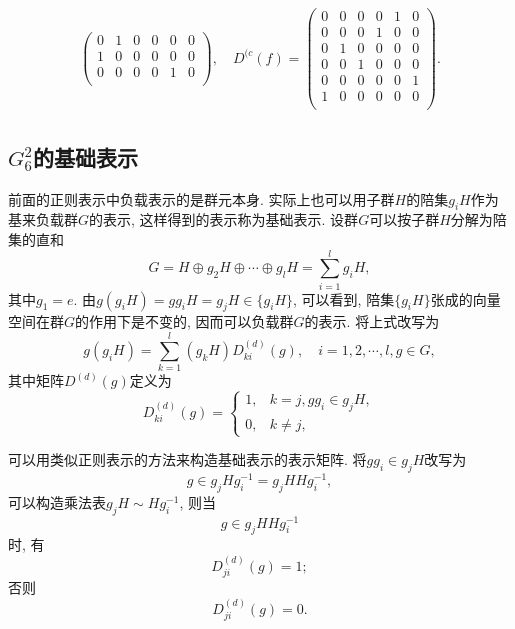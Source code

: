 \documentclass[UTF8]{ctexart}
\begin{document}
\begin{gather}
\begin{pmatrix}
    0 & 1 & 0 & 0 & 0 & 0 \\
    1 & 0 & 0 & 0 & 0 & 0 \\
    0 & 0 & 0 & 0 & 1 & 0 \\
  \end{pmatrix}, \quad
  D^{(c}(f) =
  \begin{pmatrix}
    0 & 0 & 0 & 0 & 1 & 0 \\
    0 & 0 & 0 & 1 & 0 & 0 \\
    0 & 1 & 0 & 0 & 0 & 0 \\
    0 & 0 & 1 & 0 & 0 & 0 \\
    0 & 0 & 0 & 0 & 0 & 1 \\
    1 & 0 & 0 & 0 & 0 & 0 \\
  \end{pmatrix}.
\end{gather}
\subsection{$G_6^2$的基础表示}
前面的正则表示中负载表示的是群元本身. 实际上也可以用子群$H$的陪集$g_i H$作为基来负载群$G$的表示, 这样得到的表示称为基础表示. 设群$G$可以按子群$H$分解为陪集的直和
\begin{equation}
  G = H \oplus g_2 H \oplus \cdots \oplus g_l H = \sum_{i = 1}^{l} g_i H,
\end{equation}
其中$g_1 = e$. 由$g(g_i H) = gg_i H = g_j H \in \{g_i H\}$, 可以看到, 陪集$\{g_i H\}$张成的向量空间在群$G$的作用下是不变的, 因而可以负载群$G$的表示. 将上式改写为
\begin{equation}
  g(g_i H) = \sum_{k = 1}^{l} (g_k H) D_{ki}^{(d)} (g), \quad i = 1, 2, \cdots, l , g \in G,
\end{equation}
其中矩阵$D^{(d)}(g)$定义为
\begin{equation}
  D_{ki}^{(d)} (g) =
  \begin{cases}
    1, & k = j, gg_i \in g_j H, \\
    0, & k \neq j,
  \end{cases}
\end{equation}

可以用类似正则表示的方法来构造基础表示的表示矩阵. 将$gg_i \in g_j H$改写为
\begin{equation}
  g \in g_j H g_i^{-1} = g_j H H g_i^{-1}, 
\end{equation}
可以构造乘法表$g_j H \sim H g_i^{-1}$, 则当
\begin{equation}
  g \in g_j H H g_i^{-1}
\end{equation}
时, 有
\begin{equation}
  D_{ji}^{(d)} (g) = 1;
\end{equation}
否则
\begin{equation}
  D_{ji}^{(d)} (g) = 0.
\end{equation}
\end{document}
